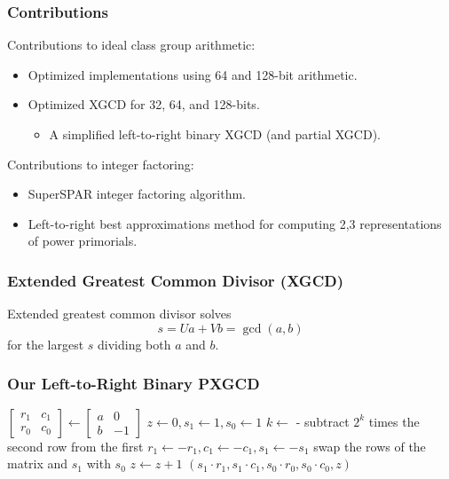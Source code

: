 \documentclass{beamer}
\newcommand{\ZZgez}{\mathbb{Z}_{\ge 0}}
\newcommand{\matrixtt}[4]{\left[ \begin{array}{rr} #1 & #2 \\ #3 & #4 \end{array} \right]}
\begin{document}
\begin{frame}
\frametitle{Contributions}
Contributions to ideal class group arithmetic:
\begin{itemize} %
\item Optimized implementations using 64 and 128-bit arithmetic.
\item Optimized XGCD for 32, 64, and 128-bits.
	\begin{itemize}
	\item A simplified left-to-right binary XGCD (and partial XGCD).
	\end{itemize}
\end{itemize}

\bigskip
Contributions to integer factoring:
\begin{itemize}
\item SuperSPAR integer factoring algorithm.
\item Left-to-right best approximations method for computing 2,3 representations of power primorials.
\end{itemize}
\end{frame}

\begin{frame}
\frametitle{Extended Greatest Common Divisor (XGCD)}
Extended greatest common divisor solves
\[
	s = Ua + Vb = \gcd(a, b)
\]
for the largest $s$ dividing both $a$ and $b$.
\end{frame}


\begin{frame}
\frametitle{Our Left-to-Right Binary PXGCD}
\begin{algorithmic}[1]
 \Comment{$a, b, T \in \ZZgez$}
\State $\matrixtt{r_1}{c_1}{r_0}{c_0} \gets \matrixtt{a}{0}{b}{-1}$
\State $z \gets 0, s_1 \gets 1, s_0 \gets 1$
	\State $k \gets $  - 
	\State subtract $2^k$ times the second row from the first
	 $r_1 \gets -r_1, c_1 \gets -c_1, s_1 \gets -s_1$ \EndIf
		\State swap the rows of the matrix and $s_1$ with $s_0$
		\State $z \gets z + 1$
	\EndIf
\EndWhile
\State \Return $(s_1 \cdot r_1, s_1 \cdot c_1, s_0 \cdot r_0, s_0 \cdot c_0, z)$
\EndProcedure
\end{algorithmic}
\end{frame}
\end{document}
